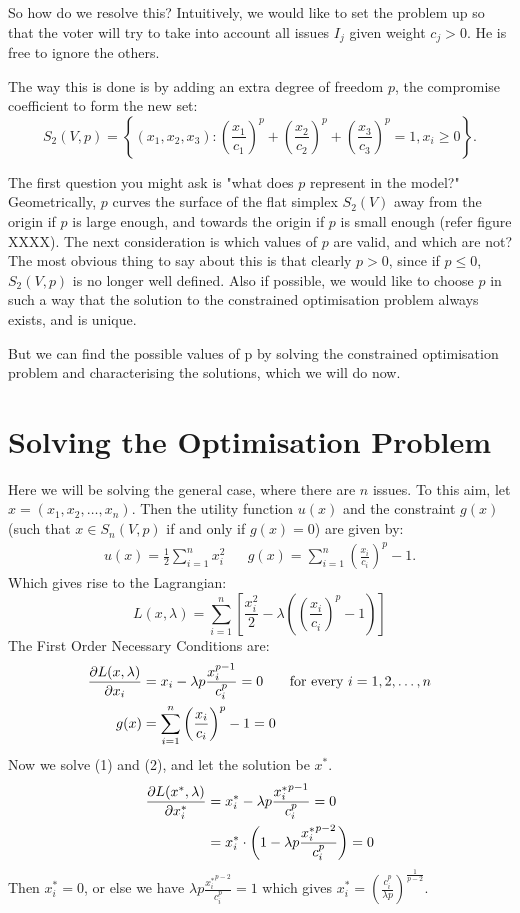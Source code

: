 \documentclass[
10pt, %
a4paper, %
oneside, %
headinclude,footinclude, %
BCOR5mm, %
]{scrartcl}
\theoremstyle{definition} %
\theoremstyle{plain} %
\theoremstyle{remark} %
\begin{document}
So how do we resolve this? Intuitively, we would like to set the problem up so that the voter will try to take into account all issues $I_j$ given weight $c_j > 0$. He is free to ignore the others.

The way this is done is by adding an extra degree of freedom $p$, the compromise coefficient to form the new set:
$$S_2(V,p) = \left\{(x_1,x_2,x_3) \colon \left(\frac{x_1}{c_1}\right)^p+ \left(\frac{x_2}{c_2}\right)^p + \left(\frac{x_3}{c_3}\right)^p = 1, x_i \geq 0\right\}.$$

The first question you might ask is "what does $p$ represent in the model?" Geometrically, $p$ curves the surface of the flat simplex $S_2(V)$ away from the origin if $p$ is large enough, and towards the origin if $p$ is small enough (refer figure XXXX). The next consideration is which values of $p$ are valid, and which are not? The most obvious thing to say about this is that clearly $p > 0$, since if $p \leq 0$, $S_2(V,p)$ is no longer well defined. Also if possible, we would like to choose $p$ in such a way that the solution to the constrained optimisation problem always exists, and is unique.

But we can find the possible values of p by solving the constrained optimisation problem and characterising the solutions, which we will do now.

\section{Solving the Optimisation Problem}
Here we will be solving the general case, where there are $n$ issues. To this aim, let $x = (x_1,x_2,\ldots,x_n)$. Then the utility function $u(x)$ and the constraint $g(x)$ (such that $x\in S_n(V,p)$ if and only if $g(x) = 0$) are given by:
\begin{align*}
u(x) = \frac{1}{2} \sum_{i=1}^n x_i^2 && g(x) = \sum_{i=1}^n \left(\frac{x_i}{c_i}\right)^p - 1.
\end{align*}
Which gives rise to the Lagrangian:
$$L(x,\lambda) = \sum_{i=1}^n \left[\frac{x_i^2}{2} - \lambda\left(\left(\frac{x_i}{c_i}\right)^p - 1\right)\right]$$
The First Order Necessary Conditions are:
\begin{align}
\frac{\partial L(x,\lambda)}{\partial x_i} &= x_i - \lambda p\frac{x_i^{p-1}}{c_i^p} = 0 & \textrm{for every $i=1,2,\ldots,n$} \\ g(x) &= \sum_{i=1}^n \left(\frac{x_i}{c_i}\right)^p -1 = 0
\end{align}
Now we solve (1) and (2), and let the solution be $x^\ast$.
\begin{align*}
\frac{\partial L(x^\ast,\lambda)}{\partial x_i^\ast} &= x_i^\ast - \lambda p\frac{{x_i^\ast}^{p-1}}{c_i^p} = 0 \\
&= x_i^\ast \cdot \left( 1 - \lambda p \frac{{x_i^\ast}^{p-2}}{c_i^p}\right) = 0
\end{align*}
Then $x_i^\ast = 0$, or else we have $\displaystyle \lambda p \frac{{x_i^\ast}^{p-2}}{c_i^p} = 1$ which gives $\displaystyle x_i^\ast = \left( \frac{c_i^p}{\lambda p} \right)^\frac{1}{p-2}$.
\end{document}
